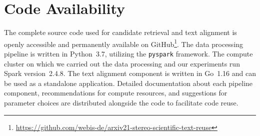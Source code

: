 \section*{Code Availability}


The complete source code used for candidate retrieval and text alignment is openly accessible and permanently available on GitHub\footnote{\url{https://github.com/webis-de/arxiv21-stereo-scientific-text-reuse}}. The data processing pipeline is written in Python~3.7, utilizing the \texttt{pyspark} framework. The compute cluster on which we carried out the data processing and our experiments run Spark version~2.4.8. The text alignment component is written in Go~1.16 and can be used as a standalone application. Detailed documentation about each pipeline component, recommendations for compute resources, and suggestions for parameter choices are distributed alongside the code to facilitate code reuse.
